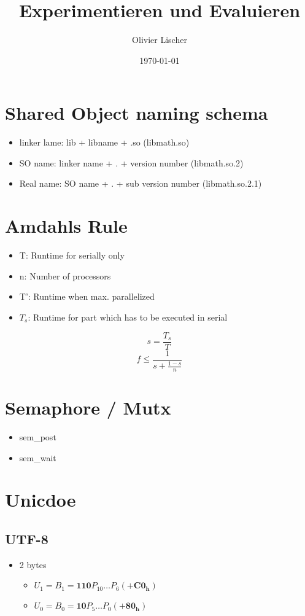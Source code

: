 \documentclass[11pt,twoside,landscape]{article}
\author{Olivier Lischer}
\date{\today}
\title{Experimentieren und Evaluieren}
\begin{document}
\maketitle
\begin{multicols}{3}
\section*{Shared Object naming schema}
\label{sec:orgb829ab0}
\begin{itemize}
\item linker lame: lib + libname + .so (libmath.so)
\item SO name: linker name + . + version number (libmath.so.2)
\item Real name: SO name + . + sub version number (libmath.so.2.1)
\end{itemize}
\section*{Amdahls Rule}
\label{sec:orge32c3e1}
\begin{itemize}
\item T: Runtime for serially only
\item n: Number of processors
\item T': Runtime when max. parallelized
\item \(T_s\): Runtime for part which has to be executed in serial
\end{itemize}
\begin{equation*}
s = \frac{T_s}{T}
\end{equation*}
\begin{equation*}
  f \leq \frac{1}{s + \frac{1-s}{n}}
\end{equation*}

\section*{Semaphore / Mutx}
\label{sec:org56851be}
\begin{itemize}
\item sem\_post
\item sem\_wait
\end{itemize}

\section*{Unicdoe}
\label{sec:orgff6f3cf}
\subsection*{UTF-8}
\label{sec:org7e59e69}
\begin{itemize}
\item 2 bytes
\begin{itemize}
\item \(U_1 = B_1 = \mathbf{110}P_10 \dots P_6 (+\mathbf{C0_h})\)
\item \(U_0 = B_0 = \mathbf{10}P_5 \dots P_0 (+\mathbf{80_h})\)
\end{itemize}


\end{itemize}
\end{multicols}
\end{document}
